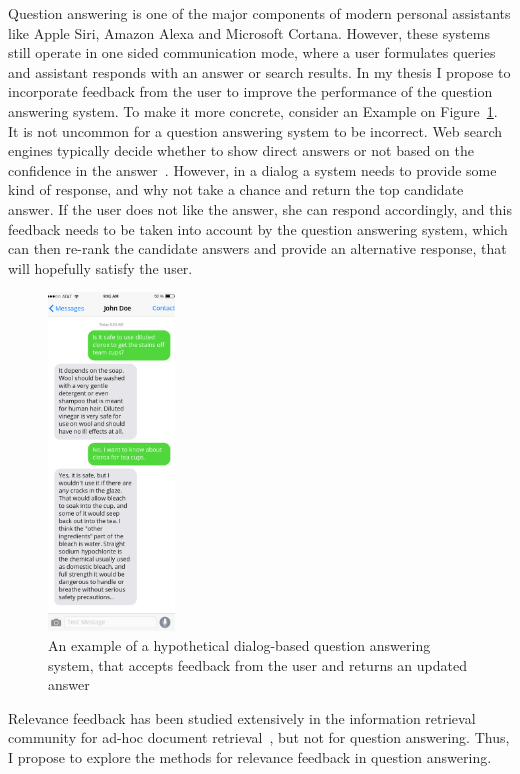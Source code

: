Question answering is one of the major components of modern personal assistants like Apple Siri, Amazon Alexa and Microsoft Cortana.
However, these systems still operate in one sided communication mode, where a user formulates queries and assistant responds with an answer or search results.
In my thesis I propose to incorporate feedback from the user to improve the performance of the question answering system.
To make it more concrete, consider an Example on Figure~\ref{figure:users:proposal:example}.
It is not uncommon for a question answering system to be incorrect.
Web search engines typically decide whether to show direct answers or not based on the confidence in the answer~\cite{yang2015wikiqa}.
However, in a dialog a system needs to provide some kind of response, and why not take a chance and return the top candidate answer.
If the user does not like the answer, she can respond accordingly, and this feedback needs to be taken into account by the question answering system, which can then re-rank the candidate answers and provide an alternative response, that will hopefully satisfy the user.

\begin{figure}
\centering
\includegraphics[width=0.3\textwidth]{img/chatbot_example}
\caption{An example of a hypothetical dialog-based question answering system, that accepts feedback from the user and returns an updated answer}
\label{figure:users:proposal:example}
\end{figure}

Relevance feedback has been studied extensively in the information retrieval community for ad-hoc document retrieval~\cite{salton1997improving,rocchio1971relevance,wang2008study}, but not for question answering.
Thus, I propose to explore the methods for relevance feedback in question answering.

